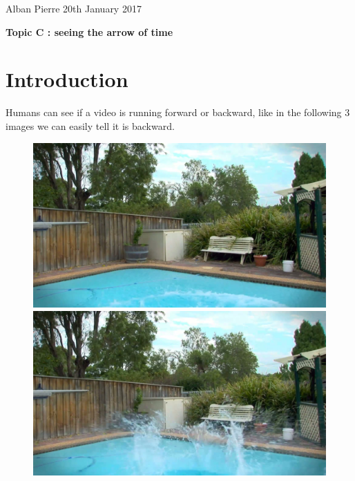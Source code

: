 \documentclass[10pt,a4paper]{report}
\begin{document}
	Alban Pierre
	\newline
	20th January 2017
	\newline
	\begin{center}
		\textbf{\Large{Topic C : seeing the arrow of time}}
		\newline
	\end{center}
	
	\section*{Introduction}
	
	Humans can see if a video is running forward or backward, like in the following 3 images we can easily tell it is backward.
	\newline
	\begin{figure}[h]
		\begin{minipage}[b]{.30\linewidth}
			\includegraphics[width=1.0\textwidth]{im01.jpeg}
		\end{minipage}
		\hspace{5pt}
		\begin{minipage}[b]{0.30\linewidth}
			\includegraphics[width=1.0\textwidth]{im30.jpeg}

\end{minipage}
\end{figure}
\end{document}
